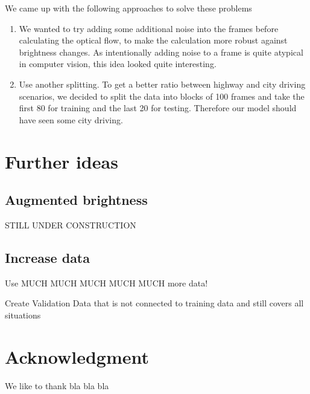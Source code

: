 \documentclass[conference]{IEEEtran}
\begin{document}
We came up with the following approaches to solve these problems
\begin{enumerate}[label=(\roman*)]
	\item We wanted to try adding some additional noise into the frames before calculating the optical flow, to make the calculation
	more robust against brightness changes. As intentionally adding 
	noise to a frame is quite atypical in computer vision, this idea looked quite interesting.
	\item Use another splitting. To get a better ratio between highway and city driving scenarios, we decided to split the data into
	blocks of 100 frames and take the first 80 for training and the last 20 for testing. Therefore our model should have seen some city
	driving.
\end{enumerate}




\section{Further ideas}

\subsection{Augmented brightness}
STILL UNDER CONSTRUCTION

\subsection{Increase data}

Use MUCH MUCH MUCH MUCH MUCH more data!

Create Validation Data that is not connected to training data and still covers all situations


\section*{Acknowledgment}
We like to thank bla bla bla




\printbibliography
\end{document}
